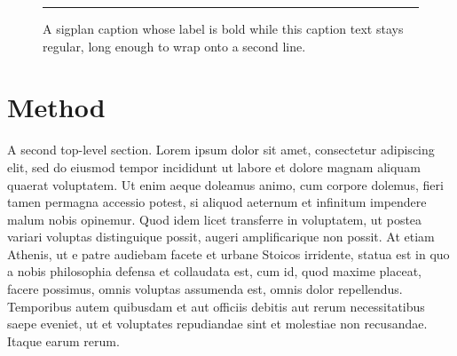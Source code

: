 \documentclass[sigplan]{acmart}
\begin{document}
\begin{figure}[h]
\centering
\rule{4cm}{1cm}
\caption{A sigplan caption whose label is bold while this caption text stays
regular, long enough to wrap onto a second line.}
\end{figure}

\section{Method}
A second top-level section. Lorem ipsum dolor sit amet, consectetur adipiscing
elit, sed do eiusmod tempor incididunt ut labore et dolore magnam aliquam quaerat
voluptatem. Ut enim aeque doleamus animo, cum corpore dolemus, fieri tamen
permagna accessio potest, si aliquod aeternum et infinitum impendere malum nobis
opinemur. Quod idem licet transferre in voluptatem, ut postea variari voluptas
distinguique possit, augeri amplificarique non possit. At etiam Athenis, ut e
patre audiebam facete et urbane Stoicos irridente, statua est in quo a nobis
philosophia defensa et collaudata est, cum id, quod maxime placeat, facere
possimus, omnis voluptas assumenda est, omnis dolor repellendus. Temporibus autem
quibusdam et aut officiis debitis aut rerum necessitatibus saepe eveniet, ut et
voluptates repudiandae sint et molestiae non recusandae. Itaque earum rerum.
\end{document}
